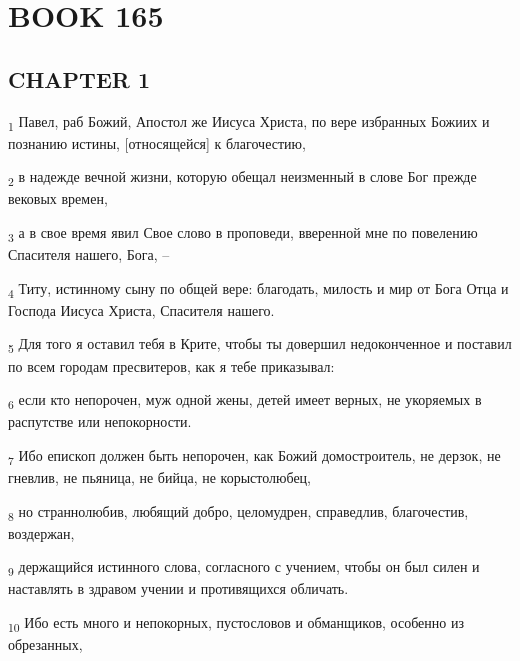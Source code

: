 \section{BOOK 165}
\subsection{CHAPTER 1}
\begin{tcolorbox}
\textsubscript{1} Павел, раб Божий, Апостол же Иисуса Христа, по вере избранных Божиих и познанию истины, [относящейся] к благочестию,
\end{tcolorbox}
\begin{tcolorbox}
\textsubscript{2} в надежде вечной жизни, которую обещал неизменный в слове Бог прежде вековых времен,
\end{tcolorbox}
\begin{tcolorbox}
\textsubscript{3} а в свое время явил Свое слово в проповеди, вверенной мне по повелению Спасителя нашего, Бога, --
\end{tcolorbox}
\begin{tcolorbox}
\textsubscript{4} Титу, истинному сыну по общей вере: благодать, милость и мир от Бога Отца и Господа Иисуса Христа, Спасителя нашего.
\end{tcolorbox}
\begin{tcolorbox}
\textsubscript{5} Для того я оставил тебя в Крите, чтобы ты довершил недоконченное и поставил по всем городам пресвитеров, как я тебе приказывал:
\end{tcolorbox}
\begin{tcolorbox}
\textsubscript{6} если кто непорочен, муж одной жены, детей имеет верных, не укоряемых в распутстве или непокорности.
\end{tcolorbox}
\begin{tcolorbox}
\textsubscript{7} Ибо епископ должен быть непорочен, как Божий домостроитель, не дерзок, не гневлив, не пьяница, не бийца, не корыстолюбец,
\end{tcolorbox}
\begin{tcolorbox}
\textsubscript{8} но страннолюбив, любящий добро, целомудрен, справедлив, благочестив, воздержан,
\end{tcolorbox}
\begin{tcolorbox}
\textsubscript{9} держащийся истинного слова, согласного с учением, чтобы он был силен и наставлять в здравом учении и противящихся обличать.
\end{tcolorbox}
\begin{tcolorbox}
\textsubscript{10} Ибо есть много и непокорных, пустословов и обманщиков, особенно из обрезанных,
\end{tcolorbox}
